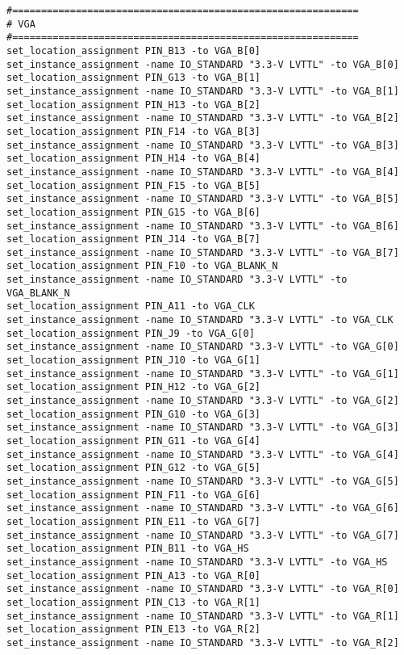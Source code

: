\documentclass[dvipdfm]{book}
\begin{document}
\begin{verbatim}
#============================================================
# VGA
#============================================================
set_location_assignment PIN_B13 -to VGA_B[0]
set_instance_assignment -name IO_STANDARD "3.3-V LVTTL" -to VGA_B[0]
set_location_assignment PIN_G13 -to VGA_B[1]
set_instance_assignment -name IO_STANDARD "3.3-V LVTTL" -to VGA_B[1]
set_location_assignment PIN_H13 -to VGA_B[2]
set_instance_assignment -name IO_STANDARD "3.3-V LVTTL" -to VGA_B[2]
set_location_assignment PIN_F14 -to VGA_B[3]
set_instance_assignment -name IO_STANDARD "3.3-V LVTTL" -to VGA_B[3]
set_location_assignment PIN_H14 -to VGA_B[4]
set_instance_assignment -name IO_STANDARD "3.3-V LVTTL" -to VGA_B[4]
set_location_assignment PIN_F15 -to VGA_B[5]
set_instance_assignment -name IO_STANDARD "3.3-V LVTTL" -to VGA_B[5]
set_location_assignment PIN_G15 -to VGA_B[6]
set_instance_assignment -name IO_STANDARD "3.3-V LVTTL" -to VGA_B[6]
set_location_assignment PIN_J14 -to VGA_B[7]
set_instance_assignment -name IO_STANDARD "3.3-V LVTTL" -to VGA_B[7]
set_location_assignment PIN_F10 -to VGA_BLANK_N
set_instance_assignment -name IO_STANDARD "3.3-V LVTTL" -to VGA_BLANK_N
set_location_assignment PIN_A11 -to VGA_CLK
set_instance_assignment -name IO_STANDARD "3.3-V LVTTL" -to VGA_CLK
set_location_assignment PIN_J9 -to VGA_G[0]
set_instance_assignment -name IO_STANDARD "3.3-V LVTTL" -to VGA_G[0]
set_location_assignment PIN_J10 -to VGA_G[1]
set_instance_assignment -name IO_STANDARD "3.3-V LVTTL" -to VGA_G[1]
set_location_assignment PIN_H12 -to VGA_G[2]
set_instance_assignment -name IO_STANDARD "3.3-V LVTTL" -to VGA_G[2]
set_location_assignment PIN_G10 -to VGA_G[3]
set_instance_assignment -name IO_STANDARD "3.3-V LVTTL" -to VGA_G[3]
set_location_assignment PIN_G11 -to VGA_G[4]
set_instance_assignment -name IO_STANDARD "3.3-V LVTTL" -to VGA_G[4]
set_location_assignment PIN_G12 -to VGA_G[5]
set_instance_assignment -name IO_STANDARD "3.3-V LVTTL" -to VGA_G[5]
set_location_assignment PIN_F11 -to VGA_G[6]
set_instance_assignment -name IO_STANDARD "3.3-V LVTTL" -to VGA_G[6]
set_location_assignment PIN_E11 -to VGA_G[7]
set_instance_assignment -name IO_STANDARD "3.3-V LVTTL" -to VGA_G[7]
set_location_assignment PIN_B11 -to VGA_HS
set_instance_assignment -name IO_STANDARD "3.3-V LVTTL" -to VGA_HS
set_location_assignment PIN_A13 -to VGA_R[0]
set_instance_assignment -name IO_STANDARD "3.3-V LVTTL" -to VGA_R[0]
set_location_assignment PIN_C13 -to VGA_R[1]
set_instance_assignment -name IO_STANDARD "3.3-V LVTTL" -to VGA_R[1]
set_location_assignment PIN_E13 -to VGA_R[2]
set_instance_assignment -name IO_STANDARD "3.3-V LVTTL" -to VGA_R[2]

\end{verbatim}
\end{document}
